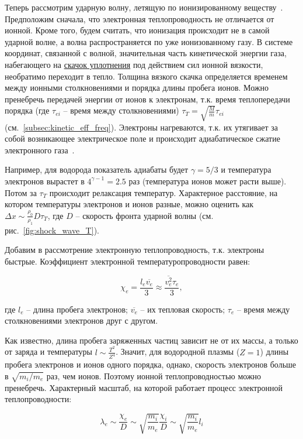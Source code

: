 \documentclass[10pt, a4paper]{article}
\begin{document}
Теперь рассмотрим ударную волну, летящую по ионизированному веществу~\cite{zeldovich}. Предположим сначала, что электронная теплопроводность не отличается от ионной. Кроме того, будем считать, что ионизация происходит не в самой ударной волне, а волна
распространяется по уже ионизованному газу. В системе координат, связанной с волной, значительная часть кинетической энергии газа, набегающего на \uline{скачок уплотнения} под действием сил ионной вязкости, необратимо переходит в тепло. Толщина вязкого скачка определяется временем между ионными столкновениями и порядка длины пробега ионов. Можно пренебречь передачей энергии от ионов к электронам, т.к. время теплопередачи порядка (где $\tau_{ei}$ -- время между столкновениями) $\tau_T=\sqrt{\frac{M}{m}}\tau_{ei}$ (см.~\ref{subsec:kinetic_eff_freq}). Электроны нагреваются, т.к. их утягивает за собой возникающее электрическое поле и происходит адиабатическое сжатие электронного газа~\cite{zeldovich}.

Например, для водорода показатель адиабаты будет $\gamma=5/3$ и температура электронов вырастет в $4^{\gamma-1}=2.5$ раз (температура ионов может расти выше). Потом за $\tau_{T}$ происходит релаксация температур. Характерное расстояние, на котором температуры электронов и ионов разные, можно оценить как $\Delta x \sim \frac{\rho_0}{\rho_1}D\tau_{T}$, где $D$ -- скорость фронта ударной волны (см. рис.~\ref{fig:shock_wave_T}).

Добавим в рассмотрение электронную теплопроводность, т.к. электроны быстрые. Коэффициент электронной температуропроводности равен:

\begin{equation*}
	\chi_e = \frac{l_e \overline{v_e}}{3} \approx \frac{\overline{v_e^{2}} \tau_e}{3},
\end{equation*}

где $l_e$ -- длина пробега электронов; $\overline{v_e}$ -- их тепловая скорость; $\tau_e$ -- время между столкновениями электронов друг с другом.

Как известно, длина пробега заряженных частиц зависит не от их массы, а только от заряда и температуры $l\sim\frac{T^{2}}{Z^{4}}$. Значит, для водородной плазмы ($Z=1$) длины пробега электронов и ионов одного порядка, однако, скорость электронов больше в $\sqrt{m_i/m_e}$ раз, чем ионов. Поэтому ионной теплопроводностью можно пренебречь. Характерный масштаб, на которой работает процесс электронной теплопроводности:

\begin{equation*}
	\lambda_e \sim \frac{\chi_e}{D} \sim \sqrt{\frac{m_i}{m_e}} \frac{\chi_i}{D} \sim \sqrt{\frac{m_i}{m_e}} l_i
\end{equation*}
\end{document}
